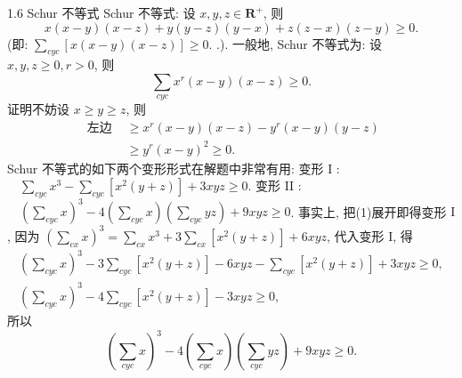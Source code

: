 1.6 Schur 不等式
Schur 不等式: 设 $x, y, z \in \mathbf{R}^{+}$, 则
$$
x(x-y)(x-z)+y(y-z)(y-x)+z(z-x)(z-y) \geqslant 0 . \label{(1)}
$$
(即: $\sum_{c y c}[x(x-y)(x-z)] \geqslant 0$. .).
一般地, Schur 不等式为: 设 $x, y, z \geqslant 0, r>0$, 则
$$
\sum_{c y c} x^r(x-y)(x-z) \geqslant 0 . \label{(2)}
$$
证明不妨设 $x \geqslant y \geqslant z$, 则
$$
\begin{aligned}
\text { 左边 } & \geqslant x^r(x-y)(x-z)-y^r(x-y)(y-z) \\
& \geqslant y^r(x-y)^2 \geqslant 0 .
\end{aligned}
$$
Schur 不等式的如下两个变形形式在解题中非常有用:
变形 I : $\quad \sum_{c y c} x^3-\sum_{c y c}\left[x^2(y+z)\right]+3 x y z \geqslant 0$.
变形 II : $\quad\left(\sum_{c y c} x\right)^3-4\left(\sum_{c y c} x\right)\left(\sum_{c y c} y z\right)+9 x y z \geqslant 0$.
事实上, 把(1)展开即得变形 $\mathrm{I}$, 因为 $\left(\sum_{c x} x\right)^3=\sum_{c x} x^3+3 \sum_{c x}\left[x^2(y+z)\right]+ 6 x y z$, 代入变形 $\mathrm{I}$, 得
$$
\begin{gathered}
\left(\sum_{c y c} x\right)^3-3 \sum_{c y c}\left[x^2(y+z)\right]-6 x y z-\sum_{c y c}\left[x^2(y+z)\right]+3 x y z \geqslant 0, \\
\left(\sum_{c y c} x\right)^3-4 \sum_{c y c}\left[x^2(y+z)\right]-3 x y z \geqslant 0,
\end{gathered}
$$
所以
$$
\left(\sum_{c y c} x\right)^3-4\left(\sum_{c y c} x\right)\left(\sum_{c y c} y z\right)+9 x y z \geqslant 0 .
$$



